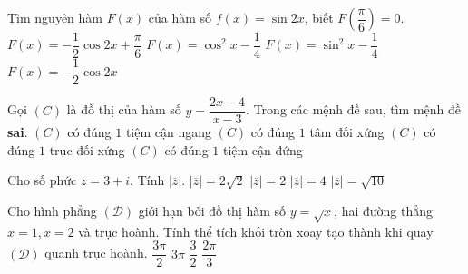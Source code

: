 \begin{ex}%
	Tìm nguyên hàm $F(x)$ của hàm số $f(x)= \sin 2x$, biết $F\left( \dfrac{\pi}{6}\right)=0$.
	\choice
	{$F(x)= -\dfrac{1}{2} \cos 2x+\dfrac{\pi}{6}$}
	{$F(x)=\cos^ 2  x-\dfrac{1}{4}$}
	{\True $F(x)= \sin^2 x-\dfrac{1}{4}$}
	{$F(x)= -\dfrac{1}{2}\cos 2x$}
\end{ex}

\begin{ex}%
	Gọi $(C)$ là đồ thị của hàm số $y=\dfrac{2x-4}{x-3}$. Trong các mệnh đề sau, tìm mệnh đề \textbf{sai}.
	\choice
	{$(C)$ có đúng $1$ tiệm cận ngang}
	{$(C)$ có đúng $1$ tâm đối xứng}
	{\True $(C)$ có đúng $1$ trục đối xứng}
	{$(C)$ có đúng $1$ tiệm cận đứng}
\end{ex}

\begin{ex}%
	Cho số phức $z=3+i$. Tính $|\overline{z}|$.
	\choice
	{ $|\overline{z}|=2\sqrt{2}$}
	{ $|\overline{z}|=2$}
	{ $|\overline{z}|=4$}
	{\True $|\overline{z}|=\sqrt{10}$}
\end{ex}

\begin{ex}%
	Cho hình phẳng $(\mathscr{D})$ giới hạn bởi đồ thị hàm số $y=\sqrt{x}$, hai đường thẳng $x=1, x=2$ và trục hoành. Tính thể tích khối tròn xoay tạo thành khi quay  $(\mathscr{D})$ quanh trục hoành.
	\choice
	{\True $\dfrac{3\pi}{2}$}
	{$3\pi$}
	{$\dfrac{3}{2}$}
	{$\dfrac{2\pi}{3}$}
\end{ex}


